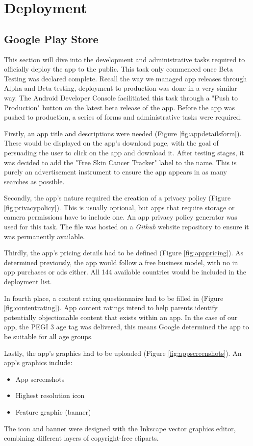 \chapter{Deployment}
\section{Google Play Store}
This section will dive into the development and administrative tasks required to officially deploy the app to the public. This task only commenced once Beta Testing was declared complete. Recall the way we managed app releases through Alpha and Beta testing, deployment to production was done in a very similar way. The Android Developer Console facilitiated this task through a "Push to Production" button on the latest beta release of the app.
Before the app was pushed to production, a series of forms and administrative tasks were required. 

Firstly, an app title and descriptions were needed (Figure \ref{fig:appdetailsform}). These would be displayed on the app's download page, with the goal of persuading the user to click on the app and download it. After testing stages, it was decided to add the "Free Skin Cancer Tracker" label to the name. This is purely an advertisement instrument to ensure the app appears in as many searches as possible.

Secondly, the app's nature required the creation of a privacy policy (Figure \ref{fig:privacypolicy}). This is usually optional, but apps that require storage or camera permissions have to include one. An app privacy policy generator \cite{nishantsrivastava} was used for this task. The file was hosted on a \emph{Github} website repository to ensure it was permanently available.

Thirdly, the app's pricing details had to be defined (Figure \ref{fig:apppricing}). As determined previously, the app would follow a free business model, with no in app purchases or ads either. All 144 available countries would be included in the deployment list.

In fourth place, a content rating questionnaire had to be filled in (Figure \ref{fig:contentrating}). App content ratings intend to help parents identify potentially objectionable content that exists within an app. In the case of our app, the PEGI 3 age tag was delivered, this means Google determined the app to be suitable for all age groups.

Lastly, the app's graphics had to be uploaded (Figure \ref{fig:appscreenshots}). An app's graphics include:
\begin{itemize}
    \item App screenshots
    \item Highest resolution icon
    \item Feature graphic (banner)
\end{itemize}
The icon and banner were designed with the Inkscape vector graphics editor, combining different layers of copyright-free cliparts.

